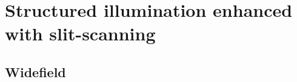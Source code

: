 %  
%  
\section{Structured illumination enhanced with \gls{slit-scanning}}

\subsection{Widefield}

